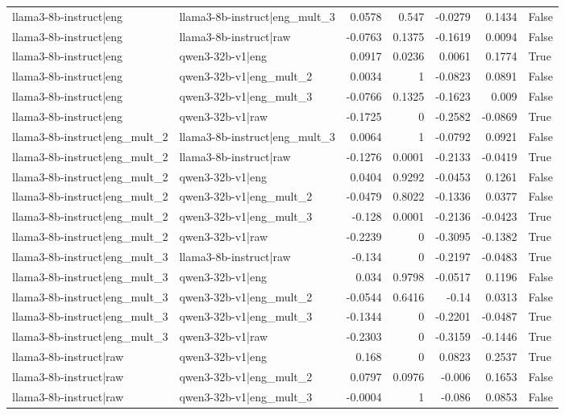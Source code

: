 \begin{table}
\begin{tabular}{l l r r r r l}
llama3-8b-instruct|eng & llama3-8b-instruct|eng_mult_3 & 0.0578 & 0.547 & -0.0279 & 0.1434 & False \\
llama3-8b-instruct|eng & llama3-8b-instruct|raw & -0.0763 & 0.1375 & -0.1619 & 0.0094 & False \\
llama3-8b-instruct|eng & qwen3-32b-v1|eng & 0.0917 & 0.0236 & 0.0061 & 0.1774 & True \\
llama3-8b-instruct|eng & qwen3-32b-v1|eng_mult_2 & 0.0034 & 1 & -0.0823 & 0.0891 & False \\
llama3-8b-instruct|eng & qwen3-32b-v1|eng_mult_3 & -0.0766 & 0.1325 & -0.1623 & 0.009 & False \\
llama3-8b-instruct|eng & qwen3-32b-v1|raw & -0.1725 & 0 & -0.2582 & -0.0869 & True \\
llama3-8b-instruct|eng_mult_2 & llama3-8b-instruct|eng_mult_3 & 0.0064 & 1 & -0.0792 & 0.0921 & False \\
llama3-8b-instruct|eng_mult_2 & llama3-8b-instruct|raw & -0.1276 & 0.0001 & -0.2133 & -0.0419 & True \\
llama3-8b-instruct|eng_mult_2 & qwen3-32b-v1|eng & 0.0404 & 0.9292 & -0.0453 & 0.1261 & False \\
llama3-8b-instruct|eng_mult_2 & qwen3-32b-v1|eng_mult_2 & -0.0479 & 0.8022 & -0.1336 & 0.0377 & False \\
llama3-8b-instruct|eng_mult_2 & qwen3-32b-v1|eng_mult_3 & -0.128 & 0.0001 & -0.2136 & -0.0423 & True \\
llama3-8b-instruct|eng_mult_2 & qwen3-32b-v1|raw & -0.2239 & 0 & -0.3095 & -0.1382 & True \\
llama3-8b-instruct|eng_mult_3 & llama3-8b-instruct|raw & -0.134 & 0 & -0.2197 & -0.0483 & True \\
llama3-8b-instruct|eng_mult_3 & qwen3-32b-v1|eng & 0.034 & 0.9798 & -0.0517 & 0.1196 & False \\
llama3-8b-instruct|eng_mult_3 & qwen3-32b-v1|eng_mult_2 & -0.0544 & 0.6416 & -0.14 & 0.0313 & False \\
llama3-8b-instruct|eng_mult_3 & qwen3-32b-v1|eng_mult_3 & -0.1344 & 0 & -0.2201 & -0.0487 & True \\
llama3-8b-instruct|eng_mult_3 & qwen3-32b-v1|raw & -0.2303 & 0 & -0.3159 & -0.1446 & True \\
llama3-8b-instruct|raw & qwen3-32b-v1|eng & 0.168 & 0 & 0.0823 & 0.2537 & True \\
llama3-8b-instruct|raw & qwen3-32b-v1|eng_mult_2 & 0.0797 & 0.0976 & -0.006 & 0.1653 & False \\
llama3-8b-instruct|raw & qwen3-32b-v1|eng_mult_3 & -0.0004 & 1 & -0.086 & 0.0853 & False \\

\end{tabular}
\end{table}
